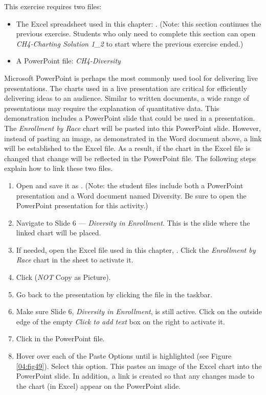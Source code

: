 This exercise requires two files:

\begin{itemize}
	\item The Excel spreadsheet used in this chapter: . (Note: this section continues the previous exercise. Students who only need to complete this section can open \textit{CH4-Charting Solution 1\_2} to start where the previous exercise ended.)
	\item A PowerPoint file: \textit{CH4-Diversity}
\end{itemize}

Microsoft PowerPoint is perhaps the most commonly used tool for delivering live presentations. The charts used in a live presentation are critical for efficiently delivering ideas to an audience. Similar to written documents, a wide range of presentations may require the explanation of quantitative data. This demonstration includes a PowerPoint slide that could be used in a presentation. The \textit{Enrollment by Race} chart will be pasted into this PowerPoint slide. However, instead of pasting an image, as demonstrated in the Word document above, a link will be established to the Excel file. As a result, if the chart in the Excel file is changed that change will be reflected in the PowerPoint file. The following steps explain how to link these two files.

\begin{enumerate}
	\item Open  and save it as . (Note: the student files include both a PowerPoint presentation and a Word document named Diversity. Be sure to open the PowerPoint presentation for this activity.) 
	\item Navigate to Slide $ 6 $ --- \textit{Diversity in Enrollment}. This is the slide where the linked chart will be placed.
	\item If needed, open the Excel file used in this chapter, . Click the \textit{Enrollment by Race} chart in the  sheet to activate it.
	\item Click  (\textit{NOT} Copy as Picture).
	\item Go back to the  presentation by clicking the file in the taskbar.
	\item Make sure Slide 6, \textit{Diversity in Enrollment}, is still active. Click on the outside edge of the empty \textit{Click to add text} box on the right to activate it.
	\item Click  in the PowerPoint file.
	\item Hover over each of the Paste Options until  is highlighted (see Figure \ref{04:fig49}). Select this option. This pastes an image of the Excel chart into the PowerPoint slide. In addition, a link is created so that any changes made to the chart (in Excel) appear on the PowerPoint slide.
\end{enumerate}


